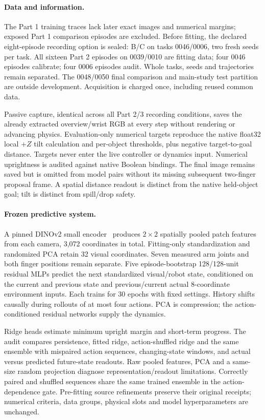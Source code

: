 \paragraph{Data and information.}
The Part 1 training traces lack later exact images and numerical margins; exposed
Part 1 comparison episodes are excluded. Before fitting, the declared eight-episode
recording option is sealed: B/C on tasks 0046/0006, two fresh seeds per task. All
sixteen Part 2 episodes on 0039/0010 are fitting data; four 0046 episodes calibrate;
four 0006 episodes audit. Whole tasks, seeds and trajectories remain separated.
The 0048/0050 final comparison and main-study test partition are outside development.
Acquisition is charged once, including reused common data.

Passive capture, identical across all Part 2/3 recording conditions, saves the
already extracted overview/wrist RGB at every step without rendering or advancing
physics. Evaluation-only numerical targets reproduce the native float32 local
$+Z$ tilt calculation and per-object thresholds, plus negative target-to-goal
distance. Targets never enter the live controller or dynamics input. Numerical
uprightness is audited against native Boolean bindings. The final image remains
saved but is omitted from model pairs without its missing subsequent two-finger
proposal frame. A spatial distance readout is distinct from the native held-object
goal; tilt is distinct from spill/drop safety.

\paragraph{Frozen predictive system.}
A pinned DINOv2 small encoder~\cite{dinov2} produces $2\times2$ spatially pooled
patch features from each camera, 3,072 coordinates in total. Fitting-only
standardization and randomized PCA retain 32 visual coordinates. Seven measured
arm joints and both finger positions remain separate. Five episode-bootstrap
128/128-unit residual MLPs predict the next standardized visual/robot state,
conditioned on the current and previous state and previous/current actual
8-coordinate environment inputs. Each trains for 30 epochs with fixed settings.
History shifts causally during rollouts of at most four actions. PCA is compression;
the action-conditioned residual networks supply the dynamics.

Ridge heads estimate minimum upright margin and short-term progress. The audit
compares persistence, fitted ridge, action-shuffled ridge and the same ensemble
with mispaired action sequences, changing-state windows, and actual versus
predicted future-state readouts. Raw pooled features, PCA and a same-size random
projection diagnose representation/readout limitations. Correctly paired and
shuffled sequences share the same trained ensemble in the action-dependence gate.
Pre-fitting source refinements preserve their original receipts; numerical criteria,
data groups, physical slots and model hyperparameters are unchanged.

